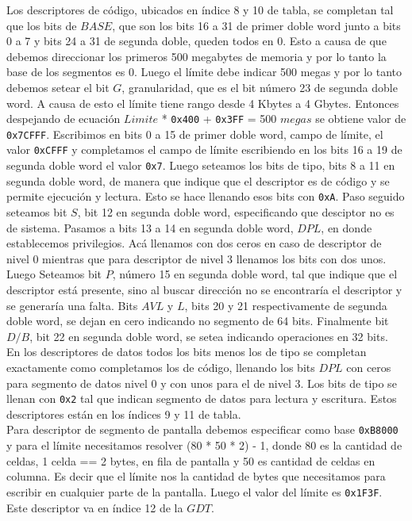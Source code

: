  Los descriptores de código, ubicados en índice 8 y 10 de tabla, se completan tal que los bits de $BASE$, que son los bits 16 a 31 de primer doble word junto a bits 0 a 7 y bits 24 a 31 de segunda doble, queden todos en 0. Esto a causa de que debemos direccionar los primeros 500 megabytes de memoria y por lo tanto la base de los segmentos es 0. Luego el límite debe indicar 500 megas y por lo tanto debemos setear el bit $G$, granularidad, que es el bit número 23 de segunda doble word. A causa de esto el límite tiene rango desde 4 Kbytes a 4 Gbytes. Entonces despejando de ecuación $Limite$ * \verb|0x400| + \verb|0x3FF| = 500 $megas$ se obtiene valor de  \verb|0x7CFFF|. Escribimos en bits 0 a 15 de primer doble word, campo de límite, el valor \verb|0xCFFF| y completamos el campo de límite escribiendo en los bits 16 a 19 de segunda doble word el valor \verb|0x7|. Luego seteamos los bits de tipo, bits 8 a 11 en segunda doble word, de manera que indique que el descriptor es de código y se permite ejecución y lectura. Esto se hace llenando esos bits con \verb|0xA|. Paso seguido seteamos bit $S$, bit 12 en segunda doble word, especificando que desciptor no es de sistema. Pasamos a bits 13 a 14 en segunda doble word, $DPL$, en donde establecemos privilegios. Acá llenamos con dos ceros en caso de descriptor de nivel 0 mientras que para descriptor de nivel 3 llenamos los bits con dos unos. Luego Seteamos bit $P$, número 15 en segunda doble word, tal que indique que el descriptor está presente, sino al buscar dirección no se encontraría el descriptor y se generaría una falta. Bits $AVL$ y $L$, bits 20 y 21 respectivamente de segunda doble word, se dejan en cero indicando no segmento de 64 bits. Finalmente bit $D/B$, bit 22 en segunda doble word, se setea indicando operaciones en 32 bits.\\
\indent En los descriptores de datos todos los bits menos los de tipo se completan exactamente como completamos los de código, llenando los bits $DPL$ con ceros para segmento de datos nivel 0 y con unos para el de nivel 3. Los bits de tipo se llenan con \verb|0x2| tal que indican segmento de datos para lectura y escritura. Estos descriptores están en los índices 9 y 11 de tabla.\\
\indent Para descriptor de segmento de pantalla debemos especificar como base \verb|0xB8000| y para el límite necesitamos resolver (80 * 50 * 2) - 1, donde 80 es la cantidad de celdas, 1 celda == 2 bytes, en fila de pantalla y 50 es cantidad de celdas en columna. Es decir que el límite nos la cantidad de bytes que necesitamos para escribir en cualquier parte de la pantalla. Luego el valor del límite es \verb|0x1F3F|. Este descriptor va en índice 12 de la $GDT$.\\

